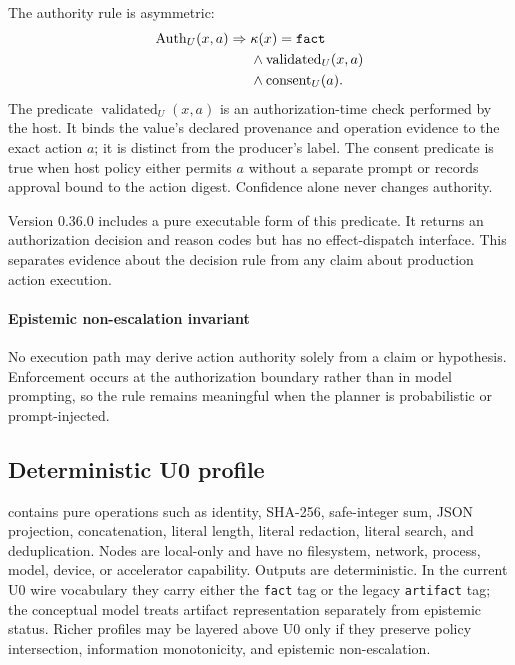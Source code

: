 The authority rule is asymmetric:
\begin{equation}
\begin{aligned}
\operatorname{Auth}_U(x,a) \Rightarrow {}& \kappa(x)=\texttt{fact} \\
&\wedge\operatorname{validated}_U(x,a) \\
&\wedge\operatorname{consent}_U(a).
\end{aligned}
\label{eq:authority}
\end{equation}
The predicate $\operatorname{validated}_U(x,a)$ is an authorization-time check performed by the host. It binds the value's declared provenance and operation evidence to the exact action $a$; it is distinct from the producer's \factkind{} label. The consent predicate is true when host policy either permits $a$ without a separate prompt or records approval bound to the action digest. Confidence alone never changes authority.

Version 0.36.0 includes a pure executable form of this predicate. It returns an authorization decision and reason codes but has no effect-dispatch interface. This separates evidence about the decision rule from any claim about production action execution.

\paragraph{Epistemic non-escalation invariant}
No execution path may derive action authority solely from a claim or hypothesis. Enforcement occurs at the authorization boundary rather than in model prompting, so the rule remains meaningful when the planner is probabilistic or prompt-injected.

\subsection{Deterministic U0 profile}
\Uzero contains pure operations such as identity, SHA-256, safe-integer sum, JSON projection, concatenation, literal length, literal redaction, literal search, and deduplication. Nodes are local-only and have no filesystem, network, process, model, device, or accelerator capability. Outputs are deterministic. In the current U0 wire vocabulary they carry either the \texttt{fact} tag or the legacy \texttt{artifact} tag; the conceptual model treats artifact representation separately from epistemic status. Richer profiles may be layered above U0 only if they preserve policy intersection, information monotonicity, and epistemic non-escalation.

